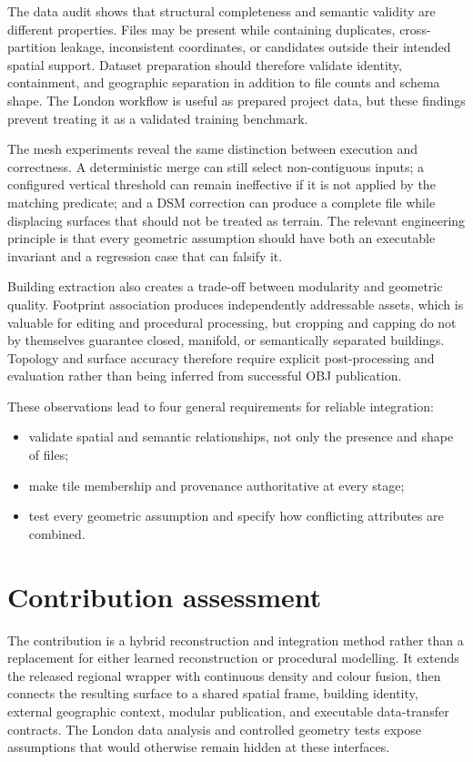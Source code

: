 The data audit shows that structural completeness and semantic validity are
different properties.  Files may be present while containing duplicates,
cross-partition leakage, inconsistent coordinates, or candidates outside their
intended spatial support.  Dataset preparation should therefore validate
identity, containment, and geographic separation in addition to file counts
and schema shape.  The London workflow is useful as prepared project data, but
these findings prevent treating it as a validated training benchmark.

The mesh experiments reveal the same distinction between execution and
correctness.  A deterministic merge can still select non-contiguous inputs;
a configured vertical threshold can remain ineffective if it is not applied
by the matching predicate; and a DSM correction can produce a complete file
while displacing surfaces that should not be treated as terrain.  The relevant
engineering principle is that every geometric assumption should have both an
executable invariant and a regression case that can falsify it.

Building extraction also creates a trade-off between modularity and geometric
quality.  Footprint association produces independently addressable assets,
which is valuable for editing and procedural processing, but cropping and
capping do not by themselves guarantee closed, manifold, or semantically
separated buildings.  Topology and surface accuracy therefore require explicit
post-processing and evaluation rather than being inferred from successful OBJ
publication.

These observations lead to four general requirements for reliable integration:

\begin{itemize}
  \item validate spatial and semantic relationships, not only the presence and
  shape of files;
  \item make tile membership and provenance authoritative at every stage;
  \item test every geometric assumption and specify how conflicting attributes
  are combined.
\end{itemize}

\section{Contribution assessment}

The contribution is a hybrid reconstruction and integration method rather than
a replacement for either learned reconstruction or procedural modelling.  It
extends the released regional wrapper with continuous density and colour
fusion, then connects the resulting surface to a shared spatial frame,
building identity, external geographic context, modular publication, and
executable data-transfer contracts.  The London data analysis and controlled
geometry tests expose assumptions that would otherwise remain hidden at these
interfaces.

